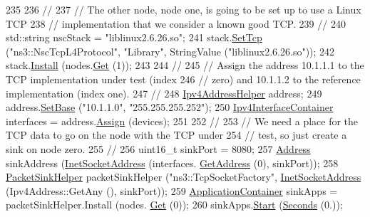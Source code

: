 \begin{DoxyCode}
235 
236   \textcolor{comment}{//}
237   \textcolor{comment}{// The other node, node one, is going to be set up to use a Linux TCP}
238   \textcolor{comment}{// implementation that we consider a known good TCP.}
239   \textcolor{comment}{//}
240   std::string nscStack = \textcolor{stringliteral}{"liblinux2.6.26.so"};
241   stack.\hyperlink{classns3_1_1InternetStackHelper_ac76e9cf493ef559f311c4ef85945129f}{SetTcp} (\textcolor{stringliteral}{"ns3::NscTcpL4Protocol"}, \textcolor{stringliteral}{"Library"}, StringValue (\textcolor{stringliteral}{"liblinux2.6.26.so"}));
242   stack.\hyperlink{classns3_1_1InternetStackHelper_a6645b412f31283d2d9bc3d8a95cebbc0}{Install} (nodes.\hyperlink{classns3_1_1NodeContainer_a9ed96e2ecc22e0f5a3d4842eb9bf90bf}{Get} (1));
243 
244   \textcolor{comment}{//}
245   \textcolor{comment}{// Assign the address 10.1.1.1 to the TCP implementation under test (index}
246   \textcolor{comment}{// zero) and 10.1.1.2 to the reference implementation (index one).}
247   \textcolor{comment}{//}
248   \hyperlink{classns3_1_1Ipv4AddressHelper}{Ipv4AddressHelper} address;
249   address.\hyperlink{classns3_1_1Ipv4AddressHelper_acf7b16dd25bac67e00f5e25f90a9a035}{SetBase} (\textcolor{stringliteral}{"10.1.1.0"}, \textcolor{stringliteral}{"255.255.255.252"});
250   \hyperlink{classns3_1_1Ipv4InterfaceContainer}{Ipv4InterfaceContainer} interfaces = address.\hyperlink{classns3_1_1Ipv4AddressHelper_af8e7f4a1a7e74c00014a1eac445a27af}{Assign} (devices);
251 
252   \textcolor{comment}{//}
253   \textcolor{comment}{// We need a place for the TCP data to go on the node with the TCP under}
254   \textcolor{comment}{// test, so just create a sink on node zero.}
255   \textcolor{comment}{//}
256   uint16\_t sinkPort = 8080;
257   \hyperlink{classns3_1_1Address}{Address} sinkAddress (\hyperlink{classns3_1_1InetSocketAddress}{InetSocketAddress} (interfaces.
      \hyperlink{classns3_1_1Ipv4InterfaceContainer_ae63208dcd222be986822937ee4aa828c}{GetAddress} (0), sinkPort));
258   \hyperlink{classns3_1_1PacketSinkHelper}{PacketSinkHelper} packetSinkHelper (\textcolor{stringliteral}{"ns3::TcpSocketFactory"}, 
      \hyperlink{classns3_1_1InetSocketAddress}{InetSocketAddress} (Ipv4Address::GetAny (), sinkPort));
259   \hyperlink{classns3_1_1ApplicationContainer}{ApplicationContainer} sinkApps = packetSinkHelper.Install (nodes.
      \hyperlink{classns3_1_1NodeContainer_a9ed96e2ecc22e0f5a3d4842eb9bf90bf}{Get} (0));
260   sinkApps.\hyperlink{classns3_1_1ApplicationContainer_a8eff87926507020bbe3e1390358a54a7}{Start} (\hyperlink{group__timecivil_ga33c34b816f8ff6628e33d5c8e9713b9e}{Seconds} (0.));

\end{DoxyCode}
